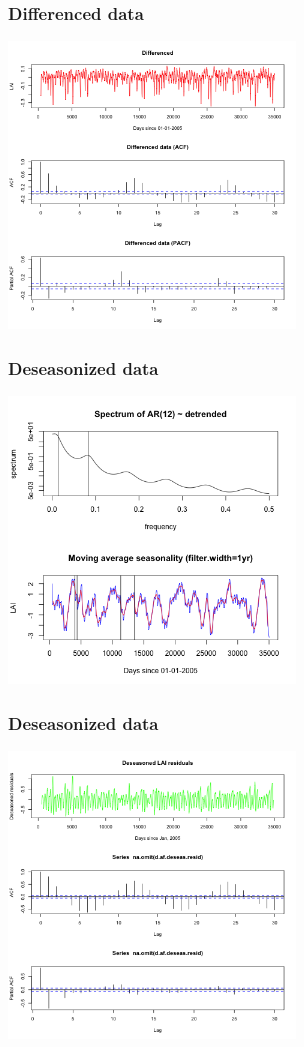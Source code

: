 \documentclass{beamer}
\begin{document}
\begin{frame}
    \frametitle{Differenced data}
    \includegraphics[height=3in]{../img/differenced_acf_pacf.png}
\end{frame}

\begin{frame}
    \frametitle{Deseasonized data}
    \includegraphics[height=3in]{../img/deseasonalization_spectrum.png}
\end{frame}

\begin{frame}
    \frametitle{Deseasonized data}
    \includegraphics[height=3in]{../img/deseasonalization_resid.png}
\end{frame}
\end{document}

